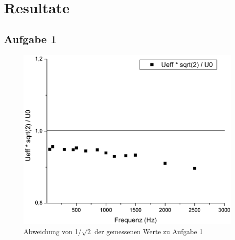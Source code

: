 \documentclass[12pt,a4paper]{article}
\begin{document}
\section{Resultate}



\subsection{Aufgabe 1}

\begin{figure}[H]
	\centering
	\includegraphics[scale=0.60]{./figure/Abweichung_Aufgabe1.png}
	\caption{Abweichung von 1/$\sqrt{2}$ der gemessenen Werte zu Aufgabe 1}
	\label{fig:abw_aufgabe1}
\end{figure}
\end{document}
